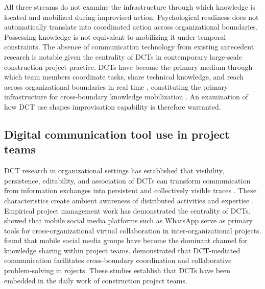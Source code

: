 \documentclass[authoryear,preprint,review,times,10pt]{elsarticle}
\begin{document}
All three streams do not examine the infrastructure through which knowledge is located and mobilized during improvised action. Psychological readiness does not automatically translate into coordinated action across organizational boundaries. Possessing knowledge is not equivalent to mobilizing it under temporal constraints. The absence of communication technology from existing antecedent research is notable given the centrality of DCTs in contemporary large-scale construction project practice. DCTs have become the primary medium through which team members coordinate tasks, share technical knowledge, and reach across organizational boundaries in real time \citep{zhang2018Mobile, jia2025Knowledge}, constituting the primary infrastructure for cross-boundary knowledge mobilization \citep{ma2022Investigating}. An examination of how DCT use shapes improvisation capability is therefore warranted.

\subsection{Digital communication tool use in project teams}
DCT research in organizational settings has established that visibility, persistence, editability, and association of DCTs can transform communication from information exchanges into persistent and collectively visible traces \citep{treem2013Social}. These characteristics create ambient awareness of distributed activities and expertise \citep{leonardi2014Social}. Empirical project management work has demonstrated the centrality of DCTs. \citet{zhang2018Mobile} showed that mobile social media platforms such as WhatsApp serve as primary tools for cross-organizational virtual collaboration in inter-organizational projects. \citet{jia2025Knowledge} found that mobile social media groups have become the dominant channel for knowledge sharing within project teams. \citet{ma2022Investigating} demonstrated that DCT-mediated communication facilitates cross-boundary coordination and collaborative problem-solving in rojects. These studies establish that DCTs have been embedded in the daily work of construction project teams.
\end{document}
